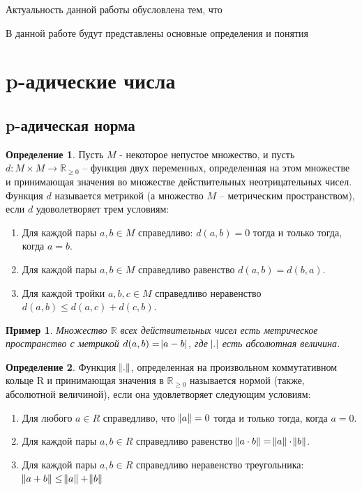 \documentclass[master, och, diploma, times]{sty/SCWorks}
\theoremstyle{plain}
\newtheorem{exmp}{Пример}[section]
\theoremstyle{definition}
\newtheorem{defn}{Определение}[section]
\begin{document}
Актуальность данной работы обусловлена тем, что

В данной работе будут представлены основные определения и понятия


\section{p-адические числа}

\subsection{p-адическая норма}

\begin{defn}
Пусть $M$ - некоторое непустое множество, и пусть \linebreak ${d: M \times M \rightarrow \mathbb {R}_{\ge0}}$ -- функция двух переменных, определенная на этом множестве и принимающая значения во множестве действительных неотрицательных чисел. Функция $d$ называется метрикой (а множество $M$ -- метрическим пространством), если $d$ удоволетворяет трем условиям:

\begin{enumerate} 
	\item Для каждой пары $a, b \in M$ справедливо: $d(a, b)=0$ тогда и только тогда, когда $a=b$.
	\item Для каждой пары $a, b \in M$ справедливо равенство $d(a, b) = d(b, a)$.
	\item Для каждой тройки $a, b, c \in M$ справедливо неравенство $d(a, b) \le d(a, c) + d(c, b)$.
\end{enumerate}
\end{defn}

\begin{exmp}
Множество $\mathbb {R}$ всех действительных чисел есть метрическое пространство с метрикой $d(a, b)= \abs{a-b}$, где $\abs{.}$ есть абсолютная величина.
\end{exmp}


\begin{defn}
Функция $\norm{.}$, определенная на произвольном коммутативном кольце R и принимающая значения в $\mathbb {R}_{\ge 0}$ называется нормой (также, абсолютной величиной), если она удовлетворяет следующим условиям:

\begin{enumerate} 
	\item Для любого $a \in R$ справедливо, что $\norm{a}=0$ тогда и только тогда, когда $a=0$.
	\item Для каждой пары $a, b \in R$ справедливо равенство $\norm{a \cdot b} = \norm{a} \cdot \norm{b}$.
	\item Для каждой пары $a, b \in R$ справедливо неравенство треугольника: $\norm{a + b} \le \norm{a} + \norm{b}$
\end{enumerate}
\end{defn}
\end{document}
